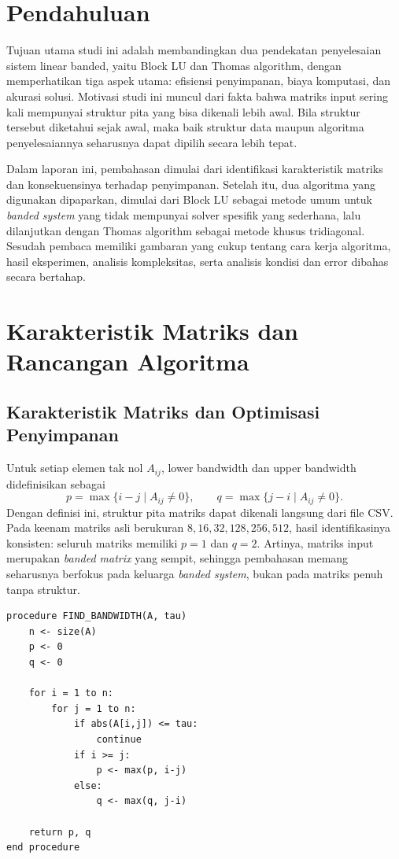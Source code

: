 \documentclass[12pt,a4paper]{article}
\begin{document}
\tableofcontents
\clearpage

\section{Pendahuluan}
Tujuan utama studi ini adalah membandingkan dua pendekatan penyelesaian sistem linear banded, yaitu Block LU dan Thomas algorithm, dengan memperhatikan tiga aspek utama: efisiensi penyimpanan, biaya komputasi, dan akurasi solusi. Motivasi studi ini muncul dari fakta bahwa matriks input sering kali mempunyai struktur pita yang bisa dikenali lebih awal. Bila struktur tersebut diketahui sejak awal, maka baik struktur data maupun algoritma penyelesaiannya seharusnya dapat dipilih secara lebih tepat.

Dalam laporan ini, pembahasan dimulai dari identifikasi karakteristik matriks dan konsekuensinya terhadap penyimpanan. Setelah itu, dua algoritma yang digunakan dipaparkan, dimulai dari Block LU sebagai metode umum untuk \emph{banded system} yang tidak mempunyai solver spesifik yang sederhana, lalu dilanjutkan dengan Thomas algorithm sebagai metode khusus tridiagonal. Sesudah pembaca memiliki gambaran yang cukup tentang cara kerja algoritma, hasil eksperimen, analisis kompleksitas, serta analisis kondisi dan error dibahas secara bertahap.

\section{Karakteristik Matriks dan Rancangan Algoritma}
\subsection{Karakteristik Matriks dan Optimisasi Penyimpanan}
Untuk setiap elemen tak nol $A_{ij}$, lower bandwidth dan upper bandwidth didefinisikan sebagai
\[
p=\max\{i-j \mid A_{ij}\neq 0\}, \qquad q=\max\{j-i \mid A_{ij}\neq 0\}.
\]
Dengan definisi ini, struktur pita matriks dapat dikenali langsung dari file CSV. Pada keenam matriks asli berukuran $8,16,32,128,256,512$, hasil identifikasinya konsisten: seluruh matriks memiliki \textbf{$p=1$} dan \textbf{$q=2$}. Artinya, matriks input merupakan \emph{banded matrix} yang sempit, sehingga pembahasan memang seharusnya berfokus pada keluarga \emph{banded system}, bukan pada matriks penuh tanpa struktur.

\begin{lstlisting}[style=pseudo,caption={Grand plan pencarian lower bandwidth $p$ dan upper bandwidth $q$.},label={lst:bandwidth}]
procedure FIND_BANDWIDTH(A, tau)
    n <- size(A)
    p <- 0
    q <- 0

    for i = 1 to n:
        for j = 1 to n:
            if abs(A[i,j]) <= tau:
                continue
            if i >= j:
                p <- max(p, i-j)
            else:
                q <- max(q, j-i)

    return p, q
end procedure
\end{lstlisting}
\end{document}
